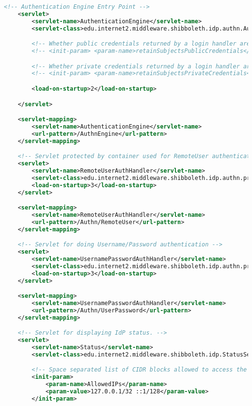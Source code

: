 \begin{lstlisting}[language=xml]
    <!-- Authentication Engine Entry Point -->
    <servlet>
        <servlet-name>AuthenticationEngine</servlet-name>
        <servlet-class>edu.internet2.middleware.shibboleth.idp.authn.AuthenticationEngine</servlet-class>

        <!-- Whether public credentials returned by a login handler are retained in the subject. -->
        <!-- <init-param> <param-name>retainSubjectsPublicCredentials</param-name> <param-value>false</param-value> </init-param> -->

        <!-- Whether private credentials returned by a login handler are retained in the subject. -->
        <!-- <init-param> <param-name>retainSubjectsPrivateCredentials</param-name> <param-value>false</param-value> </init-param> -->

        <load-on-startup>2</load-on-startup>

    </servlet>

    <servlet-mapping>
        <servlet-name>AuthenticationEngine</servlet-name>
        <url-pattern>/AuthnEngine</url-pattern>
    </servlet-mapping>

    <!-- Servlet protected by container used for RemoteUser authentication -->
    <servlet>
        <servlet-name>RemoteUserAuthHandler</servlet-name>
        <servlet-class>edu.internet2.middleware.shibboleth.idp.authn.provider.RemoteUserAuthServlet</servlet-class>
        <load-on-startup>3</load-on-startup>
    </servlet>

    <servlet-mapping>
        <servlet-name>RemoteUserAuthHandler</servlet-name>
        <url-pattern>/Authn/RemoteUser</url-pattern>
    </servlet-mapping>

    <!-- Servlet for doing Username/Password authentication -->
    <servlet>
        <servlet-name>UsernamePasswordAuthHandler</servlet-name>
        <servlet-class>edu.internet2.middleware.shibboleth.idp.authn.provider.UsernamePasswordLoginServlet</servlet-class>
        <load-on-startup>3</load-on-startup>
    </servlet>

    <servlet-mapping>
        <servlet-name>UsernamePasswordAuthHandler</servlet-name>
        <url-pattern>/Authn/UserPassword</url-pattern>
    </servlet-mapping>

    <!-- Servlet for displaying IdP status. -->
    <servlet>
        <servlet-name>Status</servlet-name>
        <servlet-class>edu.internet2.middleware.shibboleth.idp.StatusServlet</servlet-class>

        <!-- Space separated list of CIDR blocks allowed to access the status page -->
        <init-param>
            <param-name>AllowedIPs</param-name>
            <param-value>127.0.0.1/32 ::1/128</param-value>
        </init-param>


\end{lstlisting}
